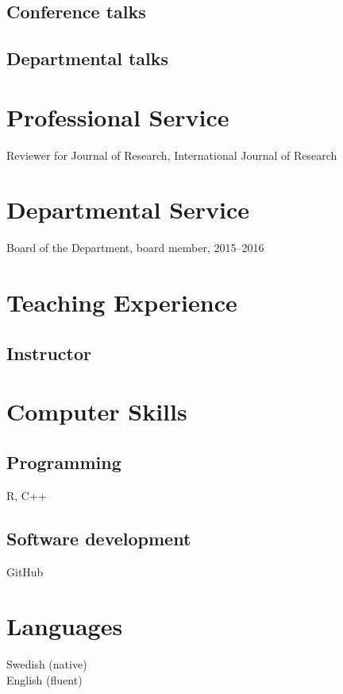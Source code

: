 \documentclass[12pt]{karencv}
\begin{document}
\subsection{Conference talks}

\subsection{Departmental talks}

\section{Professional Service}
Reviewer for Journal of Research, International Journal of Research

\section{Departmental Service}
Board of the Department, board member, 2015--2016

\section{Teaching Experience}

\subsection{Instructor}

\section{Computer Skills}
\subsection{Programming}
R, C++

\subsection{Software development}
GitHub

\section{Languages}
Swedish (native)\\
English (fluent)
\end{document}
